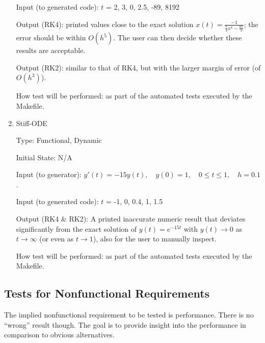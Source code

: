 \documentclass[12pt, titlepage]{article}
\begin{document}
\begin{enumerate}
Input (to generated code): $t$ = 2, 3, 0, 2.5, -89, 8192

Output (RK4): printed values close to the exact solution $x(t) = 
\frac{-1}{\frac{7}{4}x^4 - 
\frac{85}{3}}$; the error should be within $O(h^5)$. The user can then decide 
whether these results are acceptable.

Output (RK2): similar to that of RK4, but with the larger margin of error (of 
$O(h^3)$).

How test will be performed: as part of the automated tests executed by the 
Makefile.

\item{Stiff-ODE\\}

Type: Functional, Dynamic

Initial State: N/A

Input (to generator): $y'(t) = -15y(t),\quad  y(0) = 1, \quad 0 \leq t \leq 1, 
\quad h = 0.1$.

Input (to generated code): $t$ = -1, 0, 0.4, 1, 1.5

Output (RK4 \& RK2): A printed inaccurate numeric result that deviates 
significantly 
from the exact 
solution of $y(t) = e^{-15t}$ with $y(t) \rightarrow 0$ as $t \rightarrow 
\infty$ (or even as $t \rightarrow 1$), also for the user to manually inspect.

How test will be performed: as part of the automated tests executed by the 
Makefile.


%
%					
%					
%					
%					

\end{enumerate}

\subsection{Tests for Nonfunctional Requirements}
The implied nonfunctional requirement to be tested is performance. There is no 
``wrong'' result though. The goal is to provide insight into the performance in 
comparison to obvious alternatives.
\end{document}
